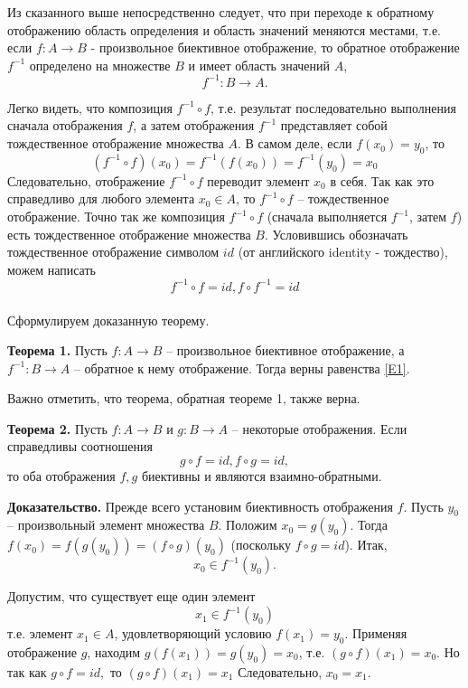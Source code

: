 \documentclass{article}
\begin{document}
\par Из сказанного выше непосредственно следует, что при переходе к обратному отображению область определения и область значений меняются местами, т.е. если $f\colon A\to B$ - произвольное биективное отображение, то обратное отображение $f^{-1}$ определено на множестве $B$ и имеет область значений $A$,
$$f^{-1}:B\to A.$$
\par Легко видеть, что композиция $f^{-1}\circ f$, т.е. результат последовательно выполнения сначала отображения $f$, а затем отображения $f^{-1}$ представляет собой тождественное отображение множества $A$. В самом деле, если $f(x_0)=y_0$, то
$$(f^{-1}\circ f)(x_0)=f^{-1}(f(x_0))=f^{-1}(y_0)=x_0$$
Следовательно, отображение $f^{-1}\circ f$ переводит элемент $x_0$ в себя. Так как это справедливо для любого элемента $x_0 \in A$, то $f^{-1}\circ f$ -- тождественное отображение. Точно так же композиция $f^{-1}\circ f$ (сначала выполняется $f^{-1}$, затем $f$) есть тождественное отображение множества $B$. Условившись обозначать тождественное отображение символом $id$ (от английского identity - тождество), можем написать
\begin{equation}\label{E1}
f^{-1}\circ f=id,f\circ f^{-1}=id
\end{equation}
\\Сформулируем доказанную теорему.
\par \textbf{Теорема  1.} Пусть $f\colon A\to B$ -- произвольное биективное отображение, а $f^{-1}\colon B\to A$ -- обратное к нему отображение. Тогда верны равенства \eqref{E1}.
\par Важно отметить, что теорема, обратная теореме 1, также верна.
\par \textbf{Теорема  2.} Пусть $f\colon A\to B$ и $g\colon B\to A$ -- некоторые отображения. Если справедливы соотношения 
\begin{equation}\label{E2}
g\circ f=id, f\circ g=id,
\end{equation}
то оба отображения $f,g$ биективны и являются взаимно-обратными.
\par \textbf{Доказательство.} Прежде всего установим биективность отображения $f$. Пусть $y_0$ -- произвольный элемент множества $B$.  Положим $x_0=g(y_0)$. Тогда $f(x_0)=f(g(y_0))=(f\circ g)(y_0)$ (поскольку $f\circ g = id$). Итак,
$$x_0\in f^{-1}(y_0).$$
\par Допустим, что существует еще один элемент 
$$x_1\in f^{-1}(y_0)$$
т.е. элемент $x_1\in A$, удовлетворяющий условию $f(x_1)=y_0$. Применяя отображение $g$, находим $g(f(x_1))=g(y_0)=x_0$, т.е. $(g\circ f)(x_1)=x_0$. Но так как $g\circ f=id,$ то $(g\circ f)(x_1)=x_1$ Следовательно, $x_0=x_1$.
\end{document}

